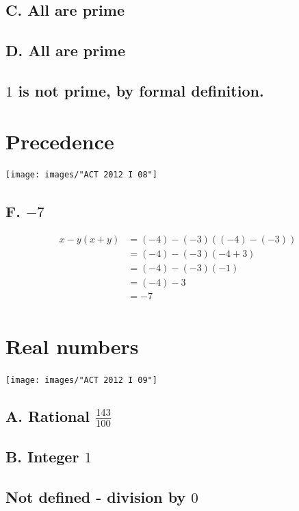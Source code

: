 \documentclass[11pt, oneside]{article}
\begin{document}
\subsection{C. All are prime}
\subsection{D. All are prime}
\subsection{{\color{blue}{E.}} $1$ is not prime, by formal definition.}

\section{Precedence}
\texttt{[image: images/"ACT 2012 I 08"]}
\subsection{F. $-7$}
%
\begin{equation}
	\begin{split}
		x-y(x+y) 
			&= (-4) - (-3) \left( (-4) - (-3)\right) \\
			&= (-4) - (-3) \left( -4 + 3 \right) \\
			&= (-4) - (-3) \left( -1\right) \\
			&= (-4) - 3 \\
			&= -7 \\
	\end{split}
\end{equation}
%

\section{Real numbers}
\texttt{[image: images/"ACT 2012 I 09"]}
\subsection{A. Rational $\frac{143}{100}$}
\subsection{B. Integer $1$}
\subsection{{\color{blue}{C.}} Not defined - division by $0$}
\end{document}
